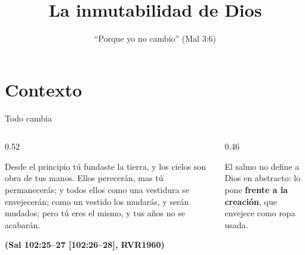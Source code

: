 \documentclass[hyperref={bookmarks=false},aspectratio=169]{beamer}
\title[La inmutabilidad de Dios]{\bfseries{La inmutabilidad de Dios}}
\subtitle{``Porque yo \SENOR{} no cambio'' (Mal 3:6)}
\author{}\institute{}\date{}
\newcommand{\fuente}[1]{\par\hfill{\upshape\bfseries\footnotesize\textcolor{azul}{#1}}}
\newcommand{\destacar}[1]{\textbf{\textcolor{azul}{#1}}}
\begin{document}
\frame{\titlepage}


\section{Contexto}

\begin{frame}{Todo cambia}
\begin{columns}[c,onlytextwidth]
\begin{column}{0.52\textwidth}
\begin{cita}Desde el principio tú fundaste la tierra, y los cielos son obra de tus manos. Ellos perecerán, mas tú permanecerás; y todos ellos como una vestidura se envejecerán; como un vestido los mudarás, y serán mudados; pero tú eres el mismo, y tus años no se acabarán.\fuente{(Sal 102:25--27 [102:26--28], RVR1960)}\end{cita}
\end{column}
\begin{column}{0.46\textwidth}
\centering
{}\par\medskip
\small El salmo no define a Dios en abstracto: lo pone \destacar{frente a la creación}, que envejece como ropa usada.
\end{column}
\end{columns}
\end{frame}
\end{document}
